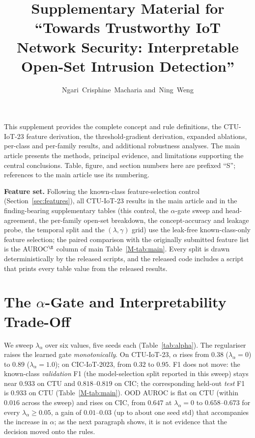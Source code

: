 \documentclass[journal]{IEEEtran}
\begin{document}
\title{Supplementary Material for\\ ``Towards Trustworthy IoT Network Security:
Interpretable Open-Set Intrusion Detection''}
\author{Ngari~Crisphine~Macharia and~Ning~Weng}
\maketitle

\noindent This supplement provides the complete concept and rule definitions, the CTU-IoT-23
feature derivation, the threshold-gradient derivation, expanded ablations, per-class and
per-family results, and additional robustness analyses. The main article presents the
methods, principal evidence, and limitations supporting the central conclusions. Table,
figure, and section numbers here are prefixed ``S''; references to the main article use its
numbering.

\noindent\textbf{Feature set.} Following the known-class feature-selection control
(Section~\ref{sec:features}), all CTU-IoT-23 results in the main article and in the
finding-bearing supplementary tables (this control, the $\alpha$-gate sweep and head-agreement,
the per-family open-set breakdown, the concept-accuracy and leakage probe,
the temporal split and the $(\lambda,\gamma)$ grid) use the leak-free
known-class-only feature selection; the paired comparison with the originally submitted feature list
is the AUROC$^\S$ column of main Table~\ref{M-tab:main}. Every split is
drawn deterministically by the released scripts, and the released code includes a script that
prints every table value from the released results.

\section{The \texorpdfstring{$\alpha$}{alpha}-Gate and Interpretability Trade-Off}
\label{sec:alpha}

We sweep $\lambda_\alpha$ over six values, five seeds each
(Table~\ref{tab:alpha}). The regulariser raises the learned gate \emph{monotonically}.
On CTU-IoT-23, $\alpha$ rises from $0.38$ ($\lambda_\alpha{=}0$) to $0.89$
($\lambda_\alpha{=}1.0$); on CIC-IoT-2023, from $0.32$ to $0.95$. F1 does not move:
the known-class \emph{validation} F1 (the model-selection split reported in this sweep)
stays near $0.933$ on CTU and $0.818$--$0.819$ on CIC; the corresponding
held-out \emph{test} F1 is $0.933$ on CTU (Table~\ref{M-tab:main}). OOD AUROC is flat on CTU
(within $0.016$ across the sweep) and rises on CIC, from $0.647$ at
$\lambda_\alpha{=}0$ to $0.658$--$0.673$ for every $\lambda_\alpha{\ge}0.05$, a
gain of $0.01$--$0.03$ (up to about one seed std) that accompanies the increase in $\alpha$; as the
next paragraph shows, it is not evidence that the decision moved onto the rules.
\end{document}
